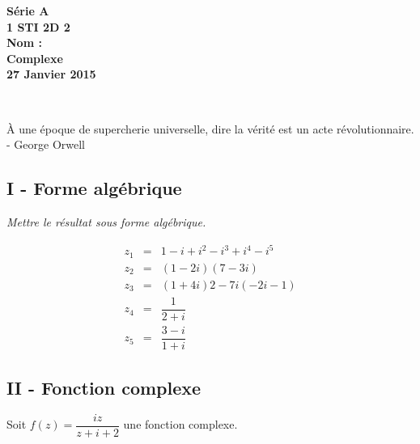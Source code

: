 \documentclass[12pt]{article}
\begin{document}

\begin{minipage}[t]{\textwidth}
  \raggedright
      {\bfseries Série A}\\[.35ex]
      {\bfseries 1 STI 2D 2}\\[.35ex]
      {\bfseries Nom : }\\[.35ex]
      \vspace*{-1cm}
      \raggedleft
          {\bfseries Complexe}\\[.35ex]
          {\bfseries 27 Janvier 2015}\\[.35ex]
\end{minipage}\\[1em]

\begin{center}
  \textsf{À une époque de supercherie universelle, dire la vérité est un acte révolutionnaire. - George Orwell}\\
\end{center}

\setlength{\columnseprule}{0pt}

\subsection*{I - Forme algébrique}

\textit{Mettre le résultat sous forme algébrique.}

\begin{eqnarray*}
  z_1 &=& 1 - i + i^{2} - i^{3} + i^{4} - i^{5}\\
  z_2 &=& (1-2i)(7-3i)\\
  z_3 &=& (1+4i)2 - 7i(-2i-1)\\
  z_4 &=& \dfrac{1}{2+i}\\
  z_5 &=& \dfrac{3-i}{1+i}
\end{eqnarray*}

\subsection*{II - Fonction complexe}

Soit $f(z) = \dfrac{i z}{z + i + 2}$ une fonction complexe.
\end{document}
